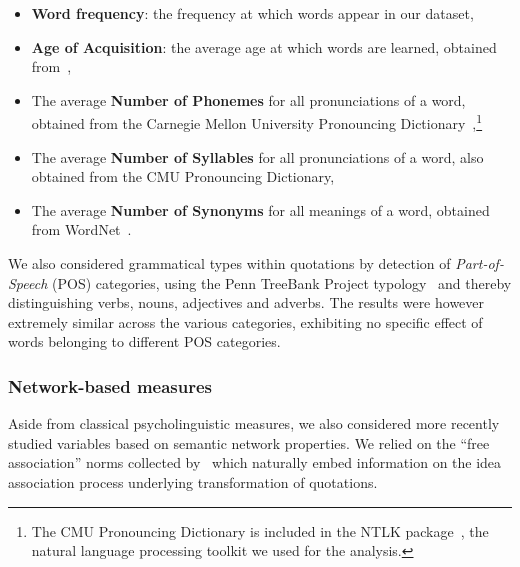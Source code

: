 \begin{itemize}
    \item \textbf{Word frequency}: the frequency at which words appear in our dataset, 
    \item \textbf{Age of Acquisition}: the average age at which words are learned, obtained from~\citet{kuperman12},
    \item The average \textbf{Number of Phonemes} for all pronunciations of a word, obtained from the Carnegie Mellon University Pronouncing Dictionary~\citep{Weide98},\footnote{The CMU Pronouncing Dictionary is included in the NTLK package~\citep{Bird09}, the natural language processing toolkit we used for the analysis.}
    \item The average \textbf{Number of Syllables} for all pronunciations of a word, also obtained from the CMU Pronouncing Dictionary,
    \item The average \textbf{Number of Synonyms} for all meanings of a word, obtained from WordNet~\citep{WordNet10}. 
\end{itemize}

We also considered grammatical types within quotations by detection of \emph{Part-of-Speech} (POS) categories, using the Penn TreeBank Project typology~\citep{Santorini90} and thereby distinguishing verbs, nouns, adjectives and adverbs.
The results were however extremely similar across the various categories, exhibiting no specific effect of words belonging to different POS categories.

\subsubsection{Network-based measures}

Aside from classical psycholinguistic measures, we also considered more recently studied variables based on semantic network properties.
We relied on the ``free association'' norms collected by~\citet{Nelson04} which naturally embed information on the idea association process underlying transformation of quotations.

